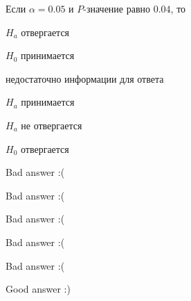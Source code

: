
\begin{question}
Если \(\alpha = 0.05\) и \(P\)-значение равно \(0.04\), то
\begin{answerlist}
  \item \(H_a\) отвергается
  \item \(H_0\) принимается
  \item недостаточно информации для ответа
  \item \(H_a\) принимается
  \item \(H_a\) не отвергается
  \item \(H_0\) отвергается
\end{answerlist}
\end{question}

\begin{solution}
\begin{answerlist}
  \item Bad answer :(
  \item Bad answer :(
  \item Bad answer :(
  \item Bad answer :(
  \item Bad answer :(
  \item Good answer :)
\end{answerlist}
\end{solution}

